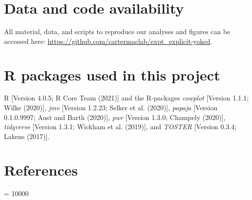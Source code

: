 \documentclass[
  english,
  jou]{apa7}
\begin{document}
\hypertarget{data-and-code-availability}{%
\section{Data and code availability}\label{data-and-code-availability}}

All material, data, and scripts to reproduce our analyses and figures can be accessed here: \url{https://github.com/cartermaclab/expt_explicit-yoked}.

\hypertarget{r-packages-used-in-this-project}{%
\section{R packages used in this project}\label{r-packages-used-in-this-project}}

R {[}Version 4.0.5; R Core Team (2021){]} and the R-packages \emph{cowplot} {[}Version 1.1.1; Wilke (2020){]}, \emph{jmv} {[}Version 1.2.23; Selker et al. (2020){]}, \emph{papaja} {[}Version 0.1.0.9997; Aust and Barth (2020){]}, \emph{pwr} {[}Version 1.3.0; Champely (2020){]}, \emph{tidyverse} {[}Version 1.3.1; Wickham et al. (2019){]}, and \emph{TOSTER} {[}Version 0.3.4; Lakens (2017){]}.

\newpage

\hypertarget{references}{%
\section{References}\label{references}}

\begingroup
\interlinepenalty = 10000
\setlength{\parindent}{-0.5in}
\setlength{\leftskip}{0.5in}

\endgroup
\end{document}
